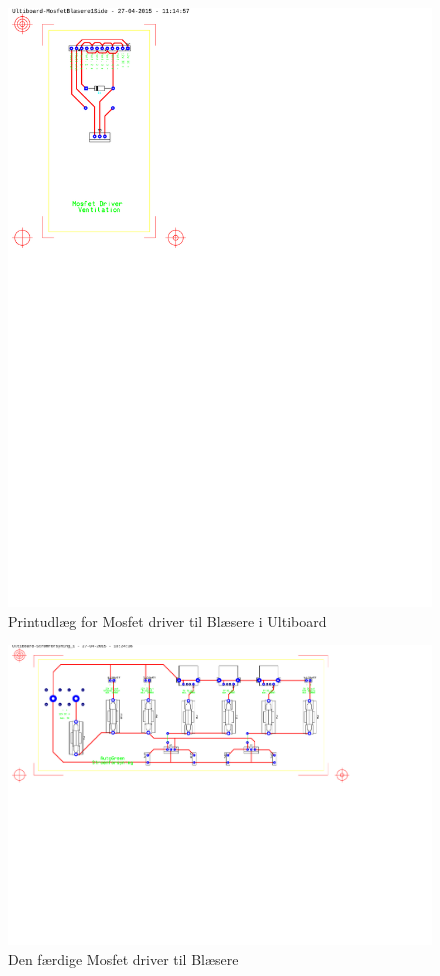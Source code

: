 \begin{figure}[h]
\centering 
\includegraphics[width={\textwidth-8cm}, trim=50 520 390 30, clip=true, angle =90] {../fig/ultiboard_blaesere.pdf}
\caption{Printudlæg for Mosfet driver til Blæsere i Ultiboard}
\label{fig:ultiboard_blaesere}
\end{figure}

\begin{figure}[h]
\centering 
\includegraphics[width={\textwidth}, trim=0 0 0 0, clip=true] {../fig/ultiboard_stroemforsyning.pdf} %
\caption{Den færdige Mosfet driver til Blæsere}
\label{fig:blaesere_print}
\end{figure}

